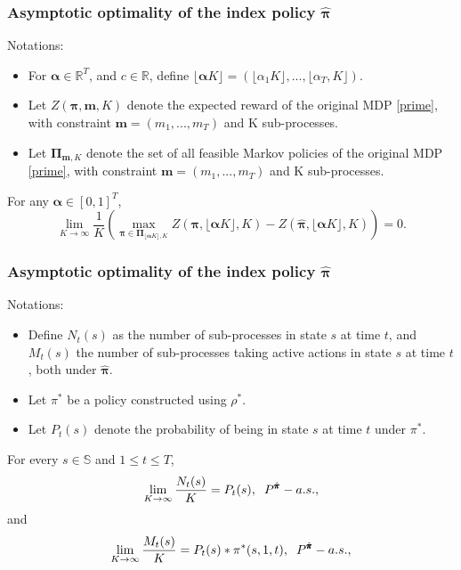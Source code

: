 \documentclass{beamer}
\newcommand{\mv}{\mathbf{m}}
\newcommand{\alphav}{\pmb{\alpha}}
\newcommand{\allp}{\pmb{\pi}}
\newcommand{\allpset}{\mathbf{\Pi}}
\newcommand{\subp}{\pi}
\newcommand{\substates}{\mathbb{S}}
\begin{document}
\begin{frame}
\frametitle{Asymptotic optimality of the index policy $\hat{\allp}$}
Notations:
\begin{itemize}
\item For $\alphav\in \mathbb{R}^T$, and $c\in \mathbb{R}$, define $\lfloor\alphav K\rfloor=(\lfloor\alpha_1 K\rfloor,...,\lfloor\alpha_T,K\rfloor)$.
\item Let $Z(\allp, \mv, K)$ denote the expected reward of the original MDP \eqref{prime}, with constraint $\mv=(m_1,...,m_T)$ and K sub-processes.
\item Let $\allpset_{\mv,K}$ denote the set of all feasible Markov policies of the original MDP \eqref{prime}, with constraint $\mv=(m_1,...,m_T)$ and K sub-processes.
\end{itemize}
\begin{theorem}[1]
For any $\alphav \in [0,1]^T$,
\begin{equation}
\lim_{K\rightarrow\infty}\frac{1}{K}\left(\max_{\allp\in\allpset_{\lfloor \alphav K\rfloor,K}}Z(\allp,\lfloor \alphav K\rfloor,K)-Z(\hat{\allp},\lfloor \alphav K\rfloor,K)\right) = 0.
\end{equation}
\end{theorem}
\end{frame}

\begin{frame}
\frametitle{Asymptotic optimality of the index policy $\hat{\allp}$}
Notations:
\begin{itemize}
\item Define $N_t(s)$ as the number of sub-processes in state $s$ at time $t$, and $M_t(s)$ the number of sub-processes taking active actions in state $s$ at time $t$, both under $\hat{\allp}$.
\item Let $\pi^{*}$ be a policy constructed using $\rho^*$.
\item Let $P_t(s)$ denote the probability of being in state $s$ at time $t$ under $\pi^*$.
\end{itemize}
\begin{theorem}[2]\label{th:conv}
For every $s\in\substates$ and $1\leq t\leq T$,
\begin{equation}\label{conv1}
\lim_{K\rightarrow\infty}\frac{N_t(s)}{K} = P_t(s), \hspace{2mm} P^{\hat{\allp}}-a.s.,
\end{equation}
and
\begin{equation}\label{conv2}
\lim_{K\rightarrow\infty}\frac{M_t(s)}{K} = P_t(s)*\subp^*(s,1,t), \hspace{2mm} P^{\hat{\allp}}-a.s., 
\end{equation}
\end{theorem}
\end{frame}
\end{document}
